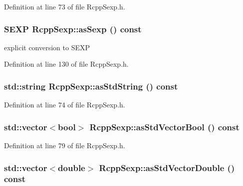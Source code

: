 Definition at line 73 of file RcppSexp.h.\hypertarget{classRcppSexp_ad55b673427e49062e2f3ec493160d1e3}{
\subsubsection[{asSexp}]{\setlength{\rightskip}{0pt plus 5cm}SEXP RcppSexp::asSexp () const}}
\label{classRcppSexp_ad55b673427e49062e2f3ec493160d1e3}
explicit conversion to SEXP 

Definition at line 130 of file RcppSexp.h.\hypertarget{classRcppSexp_ade685360b8c743411135def23f229911}{
\subsubsection[{asStdString}]{\setlength{\rightskip}{0pt plus 5cm}std::string RcppSexp::asStdString () const}}
\label{classRcppSexp_ade685360b8c743411135def23f229911}


Definition at line 74 of file RcppSexp.h.\hypertarget{classRcppSexp_aacbec90ef55c66fe5e56bdb1c84d76db}{
\subsubsection[{asStdVectorBool}]{\setlength{\rightskip}{0pt plus 5cm}std::vector$<$bool$>$ RcppSexp::asStdVectorBool () const}}
\label{classRcppSexp_aacbec90ef55c66fe5e56bdb1c84d76db}


Definition at line 79 of file RcppSexp.h.\hypertarget{classRcppSexp_ab68e3dc2062d2b336405836ffb0f22c4}{
\subsubsection[{asStdVectorDouble}]{\setlength{\rightskip}{0pt plus 5cm}std::vector$<$double$>$ RcppSexp::asStdVectorDouble () const}}
\label{classRcppSexp_ab68e3dc2062d2b336405836ffb0f22c4}


